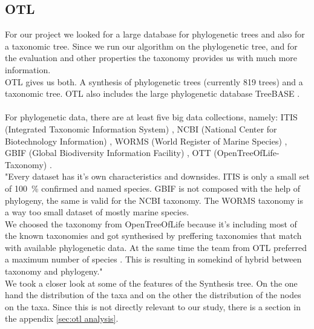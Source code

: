     \subsection{OTL}
      For our project we looked for a large database for phylogenetic trees and also for a taxonomic 
        tree. Since we run our algorithm on the phylogenetic tree, and for the evaluation and other 
        properties the taxonomy provides us with much more information. \\
      OTL gives us both. A synthesis of phylogenetic trees (currently 819 trees) and a taxonomic tree. 
        OTL also includes the large phylogenetic database TreeBASE \cite{Hinchliff2015}. \\
       \\
      For phylogenetic data, there are at least five big data collections, namely: ITIS (Integrated 
        Taxonomic Information System) \cite{ITIS}, NCBI (National Center for Biotechnology Information) 
        \cite{NCBI1988}, WORMS (World Register of Marine Species) \cite{WoRMS2018}, GBIF (Global 
        Biodiversity Information Facility) \cite{GBIF}, OTT (OpenTreeOfLife-Taxonomy) 
        \cite{Hinchliff2015}. \\
       "Every dataset has it's own characteristics and downsides. ITIS is only a small 
        set of 100~\% confirmed and named species. GBIF is not composed with the help of phylogeny, the 
        same is valid for the NCBI taxonomy. The WORMS taxonomy is a way too small dataset of mostly 
        marine species. \\
      We choosed the taxonomy from OpenTreeOfLife because it's including most of the known taxonomies 
        and got synthesised by preffering taxonomies that match with available phylogenetic data. At the 
        same time the team from OTL preferred a maximum number of species \cite{Hinchliff2015}. This is 
        resulting in somekind of hybrid between taxonomy and phylogeny." \\

      We took a closer look at some of the features of the Synthesis tree. On the one hand the 
        distribution of the taxa and on the other the distribution of the nodes on the taxa. Since this
        is not directly relevant to our study, there is a section in the appendix \ref{sec:otl analysis}.

